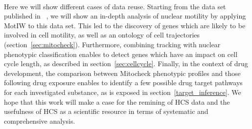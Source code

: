 



\paragraph*{}
Here we will show different cases of data reuse. Starting from the
data set published in ~\cite{pmid20360735}, we will show an in-depth
analysis of nuclear motility by applying MotIW to this data set. 
This led to the discovery of genes which are
likely to be involved in cell motility, as well as an ontology of cell
trajectories (section~\ref{sec:mitocheck}). Furthermore, combining
tracking with nuclear phenotypic classification enables to detect
genes which have an impact on cell cycle length, as described in
section~\ref{sec:cellcycle}. Finally, in the context of drug
development, the comparison between Mitocheck phenotypic profiles and
those following drug exposure enables to identify a few possible drug
target pathways for each investigated substance, as is exposed in
section~\ref{target_inference}. We hope that this work will make a
case for the remining of HCS data and the usefulness of HCS as a
scientific resource in terms of systematic and comprehensive
analysis. 


